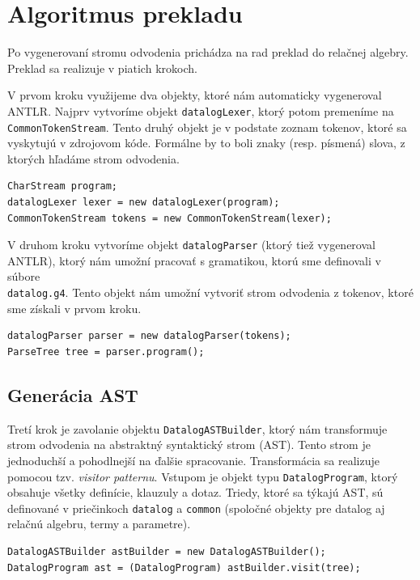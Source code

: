\section{Algoritmus prekladu}
Po vygenerovaní stromu odvodenia prichádza na rad preklad do relačnej algebry. Preklad sa realizuje
v piatich krokoch. 

V prvom kroku využijeme dva objekty, ktoré nám automaticky vygeneroval ANTLR. Najprv vytvoríme
objekt \texttt{datalogLexer}, ktorý potom premeníme na \\\texttt{CommonTokenStream}. Tento druhý
objekt je v podstate zoznam tokenov, ktoré sa vyskytujú v zdrojovom kóde. Formálne by to boli znaky
(resp. písmená) slova, z ktorých hľadáme strom odvodenia.

\begin{lstlisting}
CharStream program;
datalogLexer lexer = new datalogLexer(program);
CommonTokenStream tokens = new CommonTokenStream(lexer);
\end{lstlisting}

V druhom kroku vytvoríme objekt \texttt{datalogParser} (ktorý tiež vygeneroval ANTLR), ktorý nám
umožní pracovať s gramatikou, ktorú sme definovali v súbore \\\texttt{datalog.g4}. Tento objekt nám
umožní vytvoriť strom odvodenia z tokenov, ktoré sme získali v prvom kroku.

\begin{lstlisting}
datalogParser parser = new datalogParser(tokens);
ParseTree tree = parser.program();
\end{lstlisting}

\subsection{Generácia AST}
Tretí krok je zavolanie objektu \texttt{DatalogASTBuilder}, ktorý nám transformuje strom odvodenia
na abstraktný syntaktický strom (AST). Tento strom je jednoduchší a pohodlnejší na ďalšie
spracovanie. Transformácia sa realizuje pomocou tzv. \textit{visitor patternu}. Vstupom je objekt
typu \texttt{DatalogProgram}, ktorý obsahuje všetky definície, klauzuly a dotaz. Triedy, ktoré sa
týkajú AST, sú definované v priečinkoch \texttt{datalog} a \texttt{common} (spoločné objekty pre
datalog aj relačnú algebru, termy a parametre).

\begin{lstlisting}
DatalogASTBuilder astBuilder = new DatalogASTBuilder();
DatalogProgram ast = (DatalogProgram) astBuilder.visit(tree);
\end{lstlisting}

